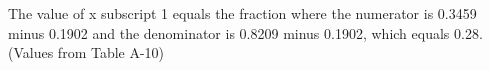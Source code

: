 The value of x subscript 1 equals the fraction where the numerator is 0.3459 minus 0.1902 and the denominator is 0.8209 minus 0.1902, which equals 0.28. (Values from Table A-10)